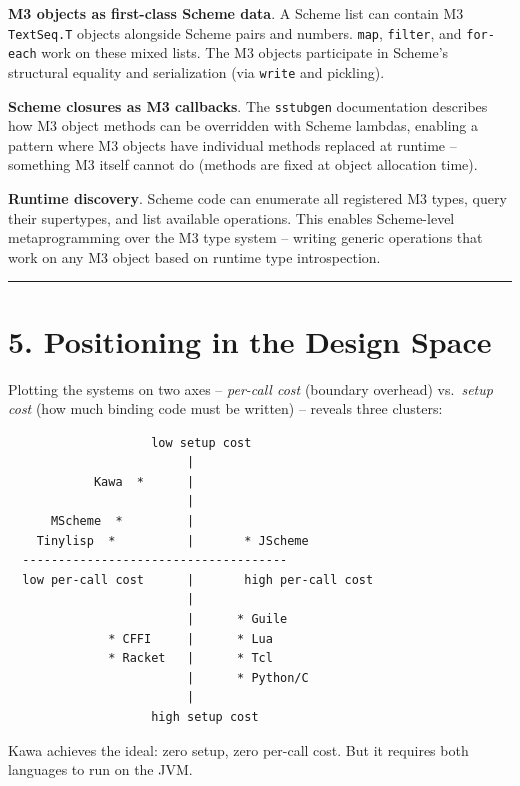 \documentclass[
  12pt,
]{report}
\newcommand{\passthrough}[1]{#1}
\begin{document}
\textbf{M3 objects as first-class Scheme data}. A Scheme list can
contain M3 \passthrough{\lstinline!TextSeq.T!} objects alongside Scheme
pairs and numbers. \passthrough{\lstinline!map!},
\passthrough{\lstinline!filter!}, and \passthrough{\lstinline!for-each!}
work on these mixed lists. The M3 objects participate in Scheme's
structural equality and serialization (via
\passthrough{\lstinline!write!} and pickling).

\textbf{Scheme closures as M3 callbacks}. The
\passthrough{\lstinline!sstubgen!} documentation describes how M3 object
methods can be overridden with Scheme lambdas, enabling a pattern where
M3 objects have individual methods replaced at runtime -- something M3
itself cannot do (methods are fixed at object allocation time).

\textbf{Runtime discovery}. Scheme code can enumerate all registered M3
types, query their supertypes, and list available operations. This
enables Scheme-level metaprogramming over the M3 type system -- writing
generic operations that work on any M3 object based on runtime type
introspection.

\begin{center}\rule{0.5\linewidth}{0.5pt}\end{center}

\section{5. Positioning in the Design
Space}\label{positioning-in-the-design-space}

Plotting the systems on two axes -- \emph{per-call cost} (boundary
overhead) vs.~\emph{setup cost} (how much binding code must be written)
-- reveals three clusters:

\begin{lstlisting}
                    low setup cost
                         |
            Kawa  *      |
                         |
      MScheme  *         |
    Tinylisp  *          |       * JScheme
  -------------------------------------
  low per-call cost      |       high per-call cost
                         |
                         |      * Guile
              * CFFI     |      * Lua
              * Racket   |      * Tcl
                         |      * Python/C
                         |
                    high setup cost
\end{lstlisting}

Kawa achieves the ideal: zero setup, zero per-call cost. But it requires
both languages to run on the JVM.
\end{document}
